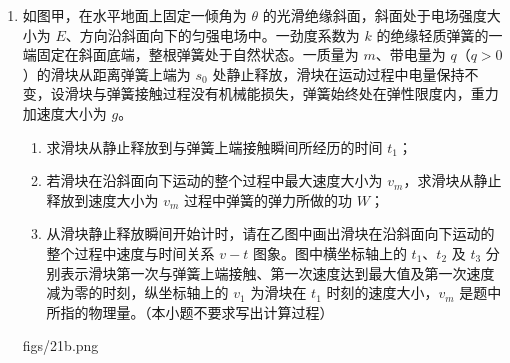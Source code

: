 \documentclass[\gkver]{gaokaozhenti}
\begin{document}
\begin{enumerate}
\jdanswer{
\begin{enumerate}
	\item
	$0.5\Us$
	\item
	$1.25\Um$
\end{enumerate}
}


\item
如图甲，在水平地面上固定一倾角为 $\theta$ 的光滑绝缘斜面，斜面处于电场强度大小为 $E$、方向沿斜面向下的匀强电场中。一劲度系数为 $k$ 的绝缘轻质弹簧的一端固定在斜面底端，整根弹簧处于自然状态。一质量为 $m$、带电量为 $q$（$q>0$）的滑块从距离弹簧上端为 $s_{0}$ 处静止释放，滑块在运动过程中电量保持不变，设滑块与弹簧接触过程没有机械能损失，弹簧始终处在弹性限度内，重力加速度大小为 $g$。

\begin{enumerate}
	\item
	求滑块从静止释放到与弹簧上端接触瞬间所经历的时间 $t_{1}$；
	\item
	若滑块在沿斜面向下运动的整个过程中最大速度大小为 $v_{m}$，求滑块从静止释放到速度大小为 $v_{m}$ 过程中弹簧的弹力所做的功 $W$；
	\item
	从滑块静止释放瞬间开始计时，请在乙图中画出滑块在沿斜面向下运动的整个过程中速度与时间关系 $v-t$ 图象。图中横坐标轴上的 $t_{1}$、$t_{2}$ 及 $t_{3}$ 分别表示滑块第一次与弹簧上端接触、第一次速度达到最大值及第一次速度减为零的时刻，纵坐标轴上的 $v_{1}$ 为滑块在 $t_{1}$ 时刻的速度大小，$v_{m}$ 是题中所指的物理量。（本小题不要求写出计算过程）
\end{enumerate}

{figs/21b.png}



\end{enumerate}
\end{document}

